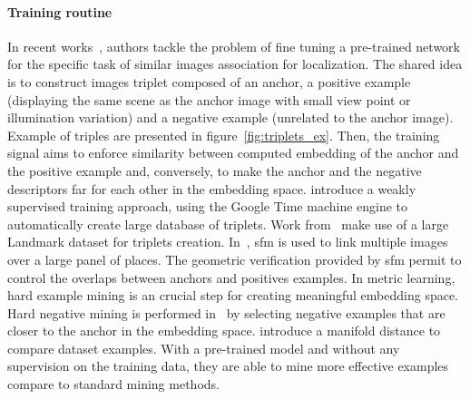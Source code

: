 
\paragraph{Training routine}
In recent works~\citep{Arandjelovic2017,Radenovic2016, Gordo2016}, authors tackle the problem of fine tuning a pre-trained network for the specific task of similar images association for localization. The shared idea is to construct images triplet composed of an anchor, a positive example (displaying the same scene as the anchor image with small view point or illumination variation) and a negative example (unrelated to the anchor image). Example of triples are presented in figure~\ref{fig:triplets_ex}. Then, the training signal aims to enforce similarity between computed embedding of the anchor and the positive example and, conversely, to make the anchor and the negative descriptors far for each other in the embedding space. \citet{Arandjelovic2017} introduce a weakly supervised training approach, using the Google Time machine engine to automatically create large database of triplets. Work from~\citep{Gordo2017,Noh2017} make use of a large Landmark dataset for triplets creation. In~\citep{Radenovic2016,Radenovic2017}, \ac{sfm} is used to link multiple images over a large panel of places. The geometric verification provided by \ac{sfm} permit to control the overlaps between anchors and positives examples. In metric learning, hard example mining is an crucial step for creating meaningful embedding space. Hard negative mining is performed in~\citep{Arandjelovic2017,Radenovic2017,Gordo2016} by selecting negative examples that are closer to the anchor in the embedding space. \citet{Iscen2018} introduce a manifold distance to compare dataset examples. With a pre-trained model and without any supervision on the training data, they are able to mine more effective examples compare to standard mining methods.


